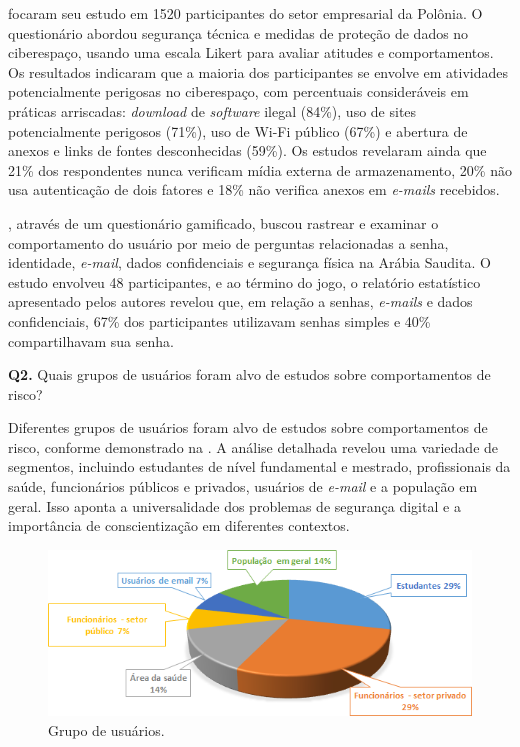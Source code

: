 \documentclass[portuguese]{textolivre}
\begin{document}
\textcite{szczepaniuk_analysis_2022} focaram seu estudo em 1520 participantes do setor empresarial da Polônia. O questionário abordou segurança técnica e medidas de proteção de dados no ciberespaço, usando uma escala Likert para avaliar atitudes e comportamentos. Os resultados indicaram que a maioria dos participantes se envolve em atividades potencialmente perigosas no ciberespaço, com percentuais consideráveis em práticas arriscadas: \textit{download} de \textit{software} ilegal (84\%), uso de sites potencialmente perigosos (71\%), uso de Wi-Fi público (67\%) e abertura de anexos e links de fontes desconhecidas (59\%). Os estudos revelaram ainda que 21\% dos respondentes nunca verificam mídia externa de armazenamento, 20\% não usa autenticação de dois fatores e 18\% não verifica anexos em \textit{e-mails} recebidos.

\textcite{alissa_appling_2022}, através de um questionário gamificado, buscou rastrear e examinar o comportamento do usuário por meio de perguntas relacionadas a senha, identidade, \textit{e-mail}, dados confidenciais e segurança física na Arábia Saudita. O estudo envolveu 48 participantes, e ao término do jogo, o relatório estatístico apresentado pelos autores revelou que, em relação a senhas, \textit{e-mails} e dados confidenciais, 67\% dos participantes utilizavam senhas simples e 40\% compartilhavam sua senha.

\textbf{Q2.} Quais grupos de usuários foram alvo de estudos sobre comportamentos de risco?

Diferentes grupos de usuários foram alvo de estudos sobre comportamentos de risco, conforme demonstrado na . A análise detalhada revelou uma variedade de segmentos, incluindo estudantes de nível fundamental e mestrado, profissionais da saúde, funcionários públicos e privados, usuários de \textit{e-mail} e a população em geral. Isso aponta a universalidade dos problemas de segurança digital e a importância de conscientização em diferentes contextos.

\begin{figure}[htbp]
\centering
\begin{minipage}{0.85\linewidth}
  \includegraphics[width=\linewidth]{Fig4.png}
  \caption{Grupo de usuários.}
  \label{fig4}
\end{minipage}
\end{figure}
\end{document}
